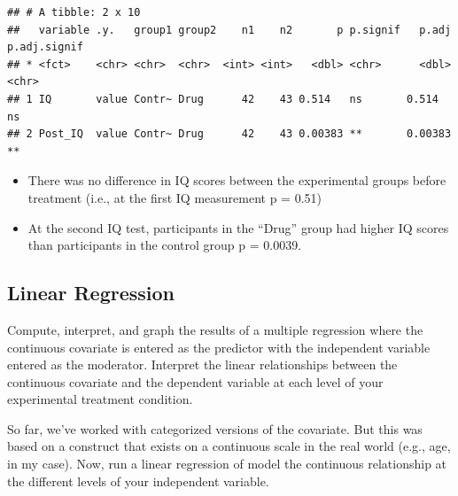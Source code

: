 \documentclass[
]{book}
\providecommand{\tightlist}{%
  \setlength{\itemsep}{0pt}\setlength{\parskip}{0pt}}
\begin{document}
\begin{verbatim}
## # A tibble: 2 x 10
##   variable .y.   group1 group2    n1    n2       p p.signif   p.adj p.adj.signif
## * <fct>    <chr> <chr>  <chr>  <int> <int>   <dbl> <chr>      <dbl> <chr>       
## 1 IQ       value Contr~ Drug      42    43 0.514   ns       0.514   ns          
## 2 Post_IQ  value Contr~ Drug      42    43 0.00383 **       0.00383 **
\end{verbatim}

\begin{itemize}
\tightlist
\item
  There was no difference in IQ scores between the experimental groups before treatment (i.e., at the first IQ measurement p = 0.51)
\item
  At the second IQ test, participants in the ``Drug'' group had higher IQ scores than participants in the control group p = 0.0039.
\end{itemize}

\subsection*{Linear Regression}\label{linear-regression}

Compute, interpret, and graph the results of a multiple regression where the continuous covariate is entered as the predictor with the independent variable entered as the moderator. Interpret the linear relationships between the continuous covariate and the dependent variable at each level of your experimental treatment condition.

So far, we've worked with categorized versions of the covariate. But this was based on a construct that exists on a continuous scale in the real world (e.g., age, in my case). Now, run a linear regression of model the continuous relationship at the different levels of your independent variable.
\end{document}
